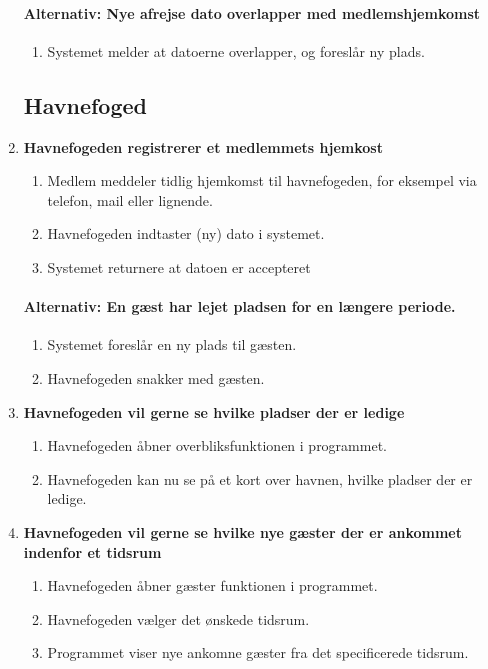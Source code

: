 \begin{enumerate}
    \paragraph{Alternativ: Nye afrejse dato overlapper med medlemshjemkomst}
      \begin{enumerate}
        \item Systemet melder at datoerne overlapper, og foreslår ny plads.
      \end{enumerate}

\subsection{Havnefoged}
    \item{\bf{Havnefogeden registrerer et medlemmets hjemkost}}
      \begin{enumerate}
        \item Medlem meddeler tidlig hjemkomst til havnefogeden, for eksempel via telefon, mail eller lignende.
        \item Havnefogeden indtaster (ny) dato i systemet.
        \item Systemet returnere at datoen er accepteret
      \end{enumerate}
  
    \paragraph{Alternativ: En gæst har lejet pladsen for en længere periode.}
      \begin{enumerate}
        \item Systemet foreslår en ny plads til gæsten.
        \item Havnefogeden snakker med gæsten.
      \end{enumerate}

    \item{\bf{Havnefogeden vil gerne se hvilke pladser der er ledige}}
      \begin{enumerate}
        \item Havnefogeden åbner overbliksfunktionen i programmet.
        \item Havnefogeden kan nu se på et kort over havnen, hvilke pladser der er ledige.
      \end{enumerate}

    \item{\bf{Havnefogeden vil gerne se hvilke nye gæster der er ankommet indenfor et tidsrum}}
      \begin{enumerate}
        \item Havnefogeden åbner gæster funktionen i programmet.
        \item Havnefogeden vælger det ønskede tidsrum.
        \item Programmet viser nye ankomne gæster fra det specificerede tidsrum.
      \end{enumerate}


\end{enumerate}
